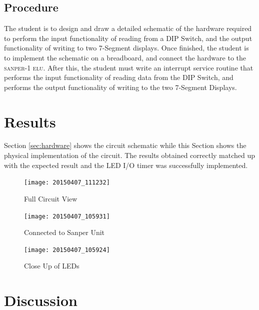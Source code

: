 \documentclass[12pt,Letter]{article}
\newcommand{\sanper}{\textsc{sanper-1 elu}}
\begin{document}
\subsection{Procedure}
The student is to design and draw a detailed schematic of the hardware required to perform the input functionality of reading from a DIP Switch, and the output functionality of writing to two 7-Segment displays. Once finished, the student is to implement the schematic on a breadboard, and connect the hardware to the \sanper. After this, the student must write an interrupt service routine that performs the input functionality of reading data from the DIP Switch, and performs the output functionality of writing to the two 7-Segment Displays.
\section{Results}
Section \ref{sec:hardware} shows the circuit schematic while this Section shows the physical implementation of the circuit. The results obtained correctly matched up with the expected result and the LED I/O timer was successfully implemented.
\begin{figure}
\centering
\texttt{[image: 20150407\_111232]}
\caption{Full Circuit View}
\label{fig:20150407_111232}
\end{figure}
\begin{figure}
\centering
\texttt{[image: 20150407\_105931]}
\caption{Connected to Sanper Unit}
\label{fig:20150407_105931}
\end{figure}

\begin{figure}[H]
\centering
\texttt{[image: 20150407\_105924]}
\caption{Close Up of LEDs}
\label{fig:closeup}
\end{figure}

\section{Discussion}
\end{document}
